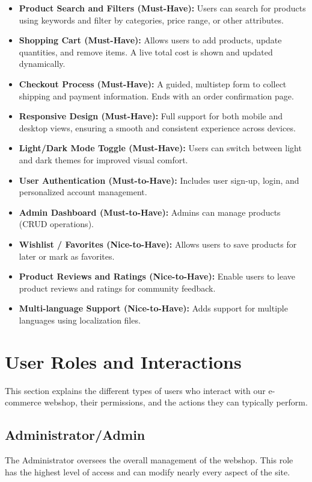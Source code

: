 \documentclass[12pt]{article}
\begin{document}
\begin{itemize}
    \item \textbf{Product Search and Filters (Must-Have):}
    Users can search for products using keywords and filter by categories, price range, or other attributes.
    \item \textbf{Shopping Cart (Must-Have):}
    Allows users to add products, update quantities, and remove items.
    A live total cost is shown and updated dynamically.
    \item \textbf{Checkout Process (Must-Have):}
    A guided, multistep form to collect shipping and payment information.
    Ends with an order confirmation page.
    \item \textbf{Responsive Design (Must-Have):}
    Full support for both mobile and desktop views, ensuring a smooth and consistent experience across devices.
    \item \textbf{Light/Dark Mode Toggle (Must-Have):}
    Users can switch between light and dark themes for improved visual comfort.
    \item \textbf{User Authentication (Must-to-Have):}
    Includes user sign-up, login, and personalized account management.
    \item \textbf{Admin Dashboard (Must-to-Have):}
    Admins can manage products (CRUD operations).
    \item \textbf{Wishlist / Favorites (Nice-to-Have):}
    Allows users to save products for later or mark as favorites.
    \item \textbf{Product Reviews and Ratings (Nice-to-Have):}
    Enable users to leave product reviews and ratings for community feedback.
    \item \textbf{Multi-language Support (Nice-to-Have):}
    Adds support for multiple languages using localization files.
\end{itemize}

\section{User Roles and Interactions}\label{sec:user-roles-and-interactions}

This section explains the different types of users who interact with our e-commerce webshop, their permissions, and the actions they can typically perform.

\subsection*{Administrator/Admin}
The Administrator oversees the overall management of the webshop.
This role has the highest level of access and can modify nearly every aspect of the site.
\end{document}
